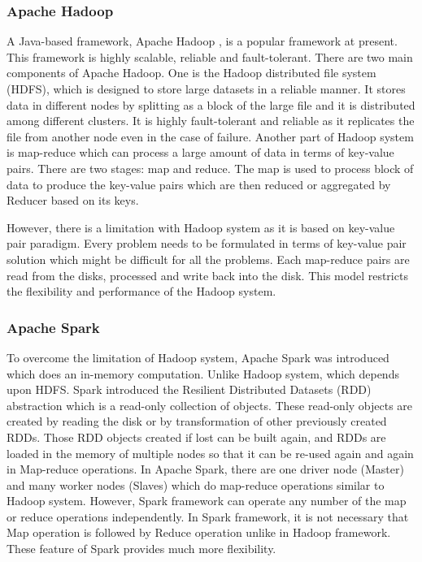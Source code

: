 \documentclass[11pt,openright]{report}
\begin{document}
\subsubsection{Apache Hadoop}
A Java-based framework, Apache Hadoop \cite{ApacheHadoop}, is a popular framework at present. This framework is highly scalable, reliable and fault-tolerant. There are two main components of Apache Hadoop. One is the Hadoop distributed file system (HDFS), which is designed to store large datasets in a reliable manner. It stores data in different nodes by splitting as a block of the large file and it is distributed among different clusters. It is highly fault-tolerant and reliable as it replicates the file from another node even in the case of failure. Another part of Hadoop system is map-reduce which can process a large amount of data in terms of key-value pairs. There are two stages: map and reduce. The map is used to process block of data to produce the key-value pairs which are then reduced or aggregated by Reducer based on its keys.

However, there is a limitation with Hadoop system as it is based on key-value pair paradigm. Every problem needs to be formulated in terms of key-value pair solution which might be difficult for all the problems. Each map-reduce pairs are read from the disks, processed and write back into the disk. This model restricts the flexibility and performance of the Hadoop system.

\subsubsection{Apache Spark}
To overcome the limitation of Hadoop system, Apache Spark \cite{Zaharia2010} was introduced which does an in-memory computation. Unlike Hadoop system, which depends upon HDFS. Spark introduced the Resilient Distributed Datasets (RDD) abstraction which is a read-only collection of objects. These read-only objects are created by reading the disk or by transformation of other previously created RDDs. Those RDD objects created if lost can be built again, and RDDs are loaded in the memory of multiple nodes so that it can be re-used again and again in Map-reduce operations. In Apache Spark, there are one driver node (Master) and many worker nodes (Slaves) which do map-reduce operations similar to Hadoop system. However, Spark framework can operate any number of the map or reduce operations independently. In Spark framework, it is not necessary that Map operation is followed by Reduce operation unlike in Hadoop framework. These feature of Spark provides much more flexibility.
\end{document}
